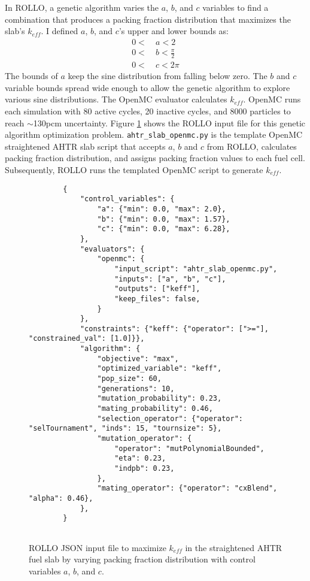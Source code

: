 In \gls{ROLLO}, a genetic algorithm varies the $a$, $b$, and $c$ variables to 
find a combination that produces a packing fraction distribution that maximizes 
the slab's $k_{eff}$. 
I defined $a$, $b$, and $c$'s upper and lower bounds as: 
\begin{align*}
    0 <\ &a < 2 \\
    0 <\ &b < \frac{\pi}{2} \\
    0 <\ &c < 2 \pi
\end{align*}
The bounds of $a$ keep the sine distribution from falling 
below zero. 
The $b$ and $c$ variable bounds spread wide enough to allow the genetic 
algorithm to explore various sine distributions. 
The OpenMC evaluator calculates $k_{eff}$. 
OpenMC runs each simulation with 80 active cycles, 20 inactive cycles, and 
8000 particles to reach $\sim$130pcm uncertainty. 
Figure \ref{fig:rollo-input-simple} shows the \gls{ROLLO} input file for this 
genetic algorithm optimization problem. 
\texttt{ahtr\_slab\_openmc.py} is the template OpenMC straightened \gls{AHTR} 
slab script that accepts $a$, $b$ and $c$ from \gls{ROLLO}, calculates packing 
fraction distribution, and assigns packing fraction values to each fuel cell. 
Subsequently, \gls{ROLLO} runs the templated OpenMC script to generate $k_{eff}$. 
\begin{figure}[]
    \begin{verbatim}
        {
            "control_variables": {
                "a": {"min": 0.0, "max": 2.0},
                "b": {"min": 0.0, "max": 1.57},
                "c": {"min": 0.0, "max": 6.28},
            },
            "evaluators": {
                "openmc": {
                    "input_script": "ahtr_slab_openmc.py",
                    "inputs": ["a", "b", "c"],
                    "outputs": ["keff"],
                    "keep_files": false,
                }
            },
            "constraints": {"keff": {"operator": [">="], "constrained_val": [1.0]}},
            "algorithm": {
                "objective": "max",
                "optimized_variable": "keff",
                "pop_size": 60,
                "generations": 10,
                "mutation_probability": 0.23,
                "mating_probability": 0.46,
                "selection_operator": {"operator": "selTournament", "inds": 15, "tournsize": 5},
                "mutation_operator": {
                    "operator": "mutPolynomialBounded",
                    "eta": 0.23,
                    "indpb": 0.23,
                },
                "mating_operator": {"operator": "cxBlend", "alpha": 0.46},
            },
        }
        
    \end{verbatim}
    \caption{\acrfull{ROLLO} JSON input file to maximize $k_{eff}$ in the 
    straightened \acrfull{AHTR} fuel slab by varying packing fraction distribution 
    with control variables $a$, $b$, and $c$.}
    \label{fig:rollo-input-simple}
\end{figure}

